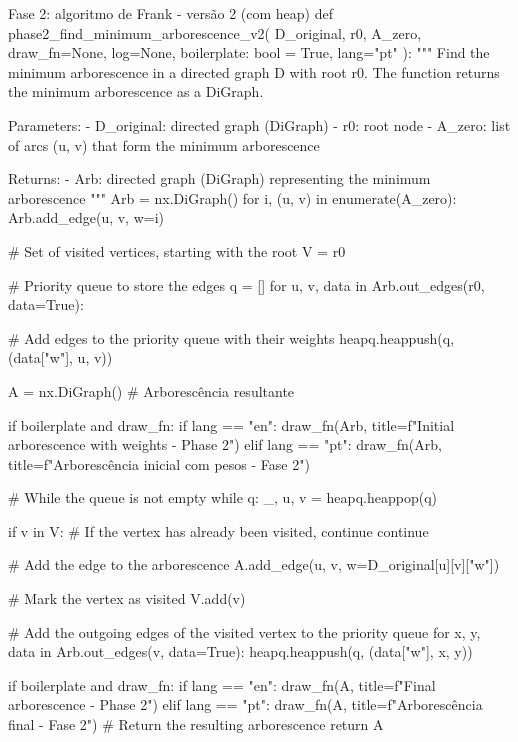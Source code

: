 \documentclass[12pt,a4paper]{article}
\begin{document}
\begin{pybox}{Fase 2: algoritmo de Frank - versão 2 (com heap)}
def phase2_find_minimum_arborescence_v2(
    D_original, r0, A_zero, draw_fn=None, log=None, boilerplate: bool = True, lang="pt"
):
    """
    Find the minimum arborescence in a directed graph D with root r0.
    The function returns the minimum arborescence as a DiGraph.

    Parameters:
        - D_original: directed graph (DiGraph)
        - r0: root node
        - A_zero: list of arcs (u, v) that form the minimum arborescence

    Returns:
        - Arb: directed graph (DiGraph) representing the minimum arborescence
    """
    Arb = nx.DiGraph()
    for i, (u, v) in enumerate(A_zero):
        Arb.add_edge(u, v, w=i)

    # Set of visited vertices, starting with the root
    V = {r0}

    # Priority queue to store the edges
    q = []
    for u, v, data in Arb.out_edges(r0, data=True):

        # Add edges to the priority queue with their weights
        heapq.heappush(q, (data["w"], u, v))

    A = nx.DiGraph()  # Arborescência resultante

    if boilerplate and draw_fn:
        if lang == "en":
            draw_fn(Arb, title=f"Initial arborescence with weights - Phase 2")
        elif lang == "pt":
            draw_fn(Arb, title=f"Arborescência inicial com pesos - Fase 2")

    # While the queue is not empty
    while q:
        _, u, v = heapq.heappop(q)

        if v in V:  # If the vertex has already been visited, continue
            continue

        # Add the edge to the arborescence
        A.add_edge(u, v, w=D_original[u][v]["w"])

        # Mark the vertex as visited
        V.add(v)

        # Add the outgoing edges of the visited vertex to the priority queue
        for x, y, data in Arb.out_edges(v, data=True):
            heapq.heappush(q, (data["w"], x, y))

    if boilerplate and draw_fn:
        if lang == "en":
            draw_fn(A, title=f"Final arborescence - Phase 2")
        elif lang == "pt":
            draw_fn(A, title=f"Arborescência final - Fase 2")
    # Return the resulting arborescence
    return A
\end{pybox}
\end{document}
